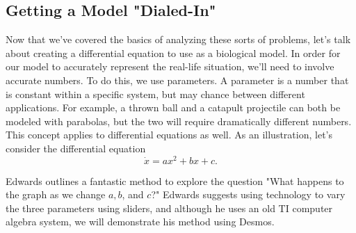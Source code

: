 \documentclass[a5paper]{article}
\theoremstyle{definition}%
\numberwithin{exercise}{section}
\theoremstyle{remark}%
\begin{document}
\subsection{Getting a Model "Dialed-In"}


Now that we've covered the basics of analyzing these sorts of problems, let's talk about creating a differential equation to use as a biological model. In order for our model to accurately represent the real-life situation, we'll need to involve accurate numbers. To do this, we use parameters. A parameter is a number that is constant within a specific system, but may chance between different applications. For example, a thrown ball and a catapult projectile can both be modeled with parabolas, but the two will require dramatically different numbers. This concept applies to differential equations as well. As an illustration, let's consider the differential equation
\begin{equation}
\dot{x}=ax^2+bx+c.
\end{equation}

Edwards outlines a fantastic method to explore the question "What happens to the graph as we change $a, b$, and $c$?" Edwards suggests using technology to vary the three parameters using sliders, and although he uses an old TI computer algebra system, we will demonstrate his method using Desmos. 
\end{document}
